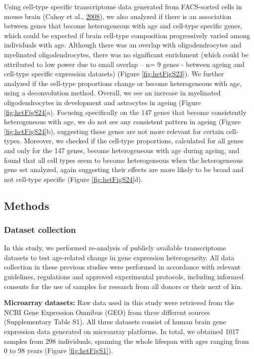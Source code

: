\documentclass[12pt,twoside]{unicam}
\begin{document}
Using cell-type specific transcriptome data generated from FACS-sorted cells in mouse brain (Cahoy et al., \protect\hyperlink{ref-Cahoy2008}{2008}), we also analyzed if there is an association between genes that become heterogeneous with age and cell-type specific genes, which could be expected if brain cell-type composition progressively varied among individuals with age. Although there was an overlap with oligodendrocytes and myelinated oligodendrocytes, there was no significant enrichment (which could be attributed to low power due to small overlap -- n= 9 genes - between ageing and cell-type specific expression datasets) (Figure \ref{fig:hetFigS23}). We further analyzed if the cell-type proportions change or become heterogeneous with age, using a deconvolution method. Overall, we see an increase in myelinated oligodendrocytes in development and astrocytes in ageing (Figure \ref{fig:hetFigS24}a). Focusing specifically on the 147 genes that become consistently heterogeneous with age, we do not see any consistent pattern in ageing (Figure \ref{fig:hetFigS24}b), suggesting these genes are not more relevant for certain cell-types. Moreover, we checked if the cell-type proportions, calculated for all genes and only for the 147 genes, become heterogeneous with age during ageing, and found that all cell types seem to become heterogeneous when the heterogeneous gene set analyzed, again suggesting their effects are more likely to be broad and not cell-type specific (Figure \ref{fig:hetFigS24}d).

\hypertarget{hetMethods}{%
\subsection{Methods}\label{hetMethods}}

\hypertarget{hetDatasets}{%
\subsubsection{Dataset collection}\label{hetDatasets}}

In this study, we performed re-analysis of publicly available transcriptome datasets to test age-related change in gene expression heterogeneity. All data collection in these previous studies were performed in accordance with relevant guidelines, regulations and approved experimental protocols, including informed consents for the use of samples for research from all donors or their next of kin.

\textbf{Microarray datasets:} Raw data used in this study were retrieved from the NCBI Gene Expression Omnibus (GEO) from three different sources (Supplementary Table S1). All three datasets consist of human brain gene expression data generated on microarray platforms. In total, we obtained 1017 samples from 298 individuals, spanning the whole lifespan with ages ranging from 0 to 98 years (Figure \ref{fig:hetFigS1}).
\end{document}
